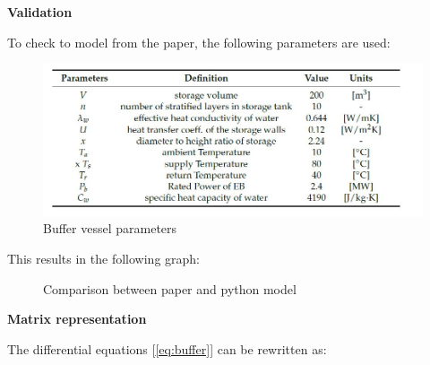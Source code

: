 \textbf{Validation}

To check to model from the paper, the following parameters are used:

\begin{figure}[h]
	\centering
	\includegraphics[width=0.6\columnwidth]{Figures/parameters_paper.JPG}
	\caption[Short title]{Buffer vessel parameters}
\end{figure}

This results in the following graph:

\begin{figure}[H]
	\centering
	\qquad
	\caption{Comparison between paper and python model}
	\label{fig:Comparison}
\end{figure}

\textbf{Matrix representation}

The differential equations [\ref{eq:buffer}] can be rewritten as:

